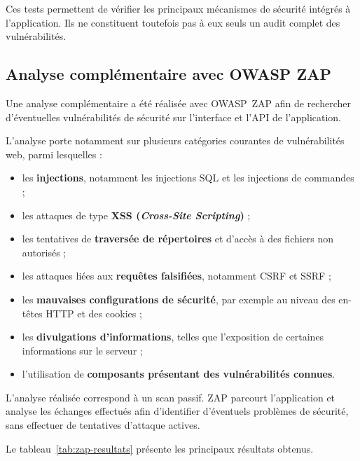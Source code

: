 Ces tests permettent de vérifier les principaux mécanismes de sécurité intégrés à l'application. Ils ne constituent toutefois pas à eux seuls un audit complet des vulnérabilités.

\subsection{Analyse complémentaire avec OWASP ZAP}

Une analyse complémentaire a été réalisée avec OWASP~ZAP afin de rechercher d'éventuelles vulnérabilités de sécurité sur l'interface et l'API de l'application.

L'analyse porte notamment sur plusieurs catégories courantes de vulnérabilités web, parmi lesquelles :

\begin{itemize}

    \item les \textbf{injections}, notamment les injections SQL et les injections de commandes ;

    \item les attaques de type \textbf{XSS (\textit{Cross-Site Scripting})} ;

    \item les tentatives de \textbf{traversée de répertoires} et d'accès à des fichiers non autorisés ;

    \item les attaques liées aux \textbf{requêtes falsifiées}, notamment CSRF et SSRF ;

    \item les \textbf{mauvaises configurations de sécurité}, par exemple au niveau des en-têtes HTTP et des cookies ;

    \item les \textbf{divulgations d'informations}, telles que l'exposition de certaines informations sur le serveur ;

    \item l'utilisation de \textbf{composants présentant des vulnérabilités connues}.

\end{itemize}

L'analyse réalisée correspond à un scan passif. ZAP parcourt l'application et analyse les échanges effectués afin d'identifier d'éventuels problèmes de sécurité, sans effectuer de tentatives d'attaque actives.

Le tableau~\ref{tab:zap-resultats} présente les principaux résultats obtenus.

